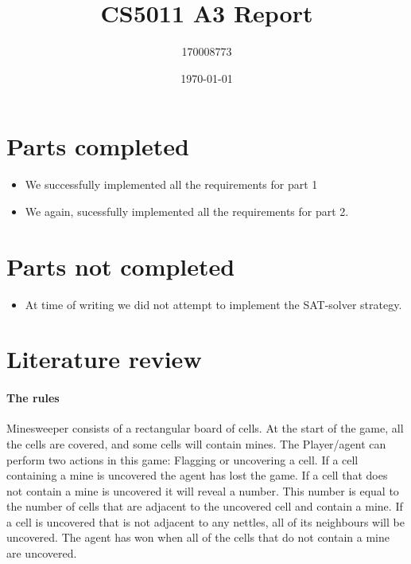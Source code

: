 \documentclass[british]{article}
\title{CS5011 A3 Report}
\author{170008773}
\date{\today}
\begin{document}
\maketitle
\section{Parts completed}
\label{completed}
\begin{itemize}
\item We successfully implemented all the requirements for part 1
\item We again, sucessfully implemented all the requirements for part 2.
\end{itemize}
\section{Parts not completed}
\label{uncompleted}
\begin{itemize}
\item At time of writing we did not attempt to implement the SAT-solver strategy.
\end{itemize}
\section{Literature review}
\label{litrev}

\paragraph{The rules} Minesweeper consists of a rectangular board of cells. At the start of the game, all the cells are covered, and some cells will contain mines. The Player/agent can perform two actions in this game: Flagging or uncovering a cell. If a cell containing a mine is uncovered the agent has lost the game. If a cell that does not contain a mine is uncovered it will reveal a number. This number is equal to the number of cells that are adjacent to the uncovered cell and contain a mine. If a cell is uncovered that is not adjacent to any nettles, all of its neighbours will be uncovered. The agent has won when all of the cells that do not contain a mine are uncovered.
\end{document}

